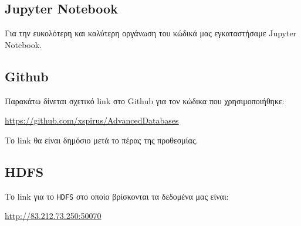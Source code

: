 \documentclass{ntua}
\begin{document}
\subsection{Jupyter Notebook}
Για την ευκολότερη και καλύτερη οργάνωση του κώδικά μας εγκαταστήσαμε Jupyter Notebook.

\subsection{Github}
Παρακάτω δίνεται σχετικό link στο Github για τον κώδικα που χρησιμοποιήθηκε:
\begin{center}
\url{https://github.com/xspirus/AdvancedDatabases}
\end{center}
\noindent
Το link θα είναι δημόσιο μετά το πέρας της προθεσμίας.

\subsection{HDFS}
Το link για το \texttt{HDFS} στο οποίο βρίσκονται τα δεδομένα μας είναι:
\begin{center}
\url{http://83.212.73.250:50070}
\end{center}
\end{document}
